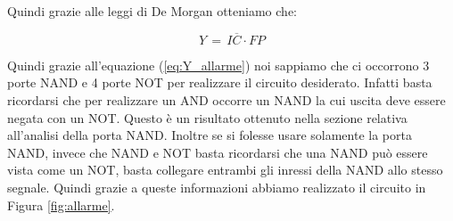 Quindi grazie alle leggi di De Morgan otteniamo che:

\begin{equation}
	Y\,=\,I\overline{C} \cdot FP
	\label{eq:Y_allarme}
\end{equation}

Quindi grazie all'equazione (\ref{eq:Y_allarme}) noi sappiamo che ci occorrono 3 porte NAND e 4 porte NOT per realizzare il circuito desiderato. Infatti basta ricordarsi che per realizzare un AND occorre un NAND la cui uscita deve essere negata con un NOT. Questo è un risultato ottenuto nella sezione relativa all'analisi della porta NAND. Inoltre se si folesse usare solamente la porta NAND, invece che NAND e NOT basta ricordarsi che una NAND può essere vista come un NOT, basta collegare entrambi gli inressi della NAND allo stesso segnale. Quindi grazie a queste informazioni abbiamo realizzato il circuito in Figura \ref{fig:allarme}.





